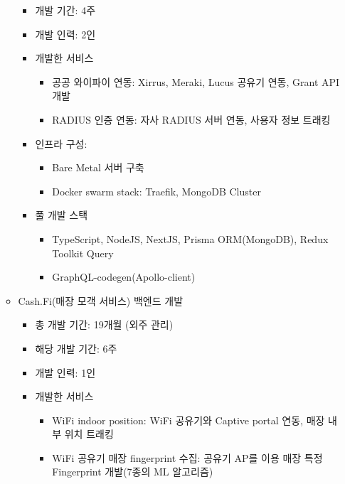 \begin{itemize}[label=]
\begin{itemize}[label=]
		            \begin{itemize}[label=]
			            \item 개발 기간: 4주
			            \item 개발 인력: 2인
			            \item 개발한 서비스
			                  \begin{itemize}
				                  \item 공공 와이파이 연동: Xirrus, Meraki, Lucus 공유기 연동, Grant API 개발
				                  \item RADIUS 인증 연동: 자사 RADIUS 서버 연동, 사용자 정보 트래킹
			                  \end{itemize}
			            \item 인프라 구성:
			                  \begin{itemize}
				                  \item Bare Metal 서버 구축
				                  \item Docker swarm stack: Traefik, MongoDB Cluster
			                  \end{itemize}
			            \item 풀 개발 스택
			                  \begin{itemize}
				                  \item TypeScript, NodeJS, NextJS, Prisma ORM(MongoDB), Redux Toolkit Query
				                  \item GraphQL-codegen(Apollo-client)
			                  \end{itemize}
		            \end{itemize}
		      \item Cash.Fi(매장 모객 서비스) 백엔드 개발
		            \begin{itemize}[label=]
			            \item 총 개발 기간: 19개월 (외주 관리)
			            \item 해당 개발 기간: 6주
			            \item 개발 인력: 1인
			            \item 개발한 서비스
			                  \begin{itemize}
				                  \item WiFi indoor position: WiFi 공유기와 Captive portal 연동, 매장 내부 위치 트래킹
				                  \item WiFi 공유기 매장 fingerprint 수집: 공유기 AP를 이용 매장 특정 Fingerprint 개발(7종의 ML 알고리즘)

\end{itemize}
\end{itemize}
\end{itemize}
\end{itemize}
